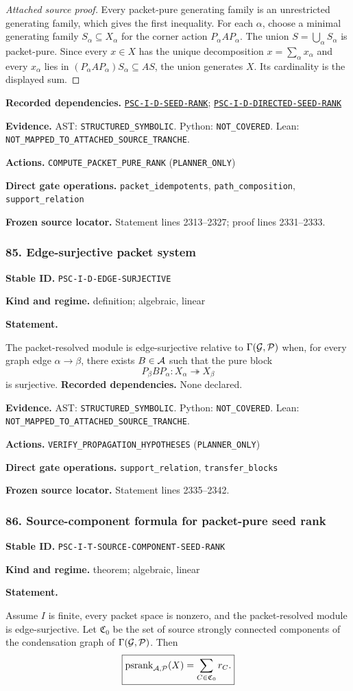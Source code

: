 \documentclass[a4paper,11pt]{article}
\newcommand{\field}[2]{\noindent\textbf{#1.} #2\par}
\begin{document}
\begin{proof}[Attached source proof]
Every packet-pure generating family is an unrestricted generating family, which gives the first inequality.  For each $\alpha$, choose a minimal generating family $S_\alpha\subseteq X_\alpha$ for the corner action $P_\alpha A P_\alpha$.  The union $S=\bigcup_\alpha S_\alpha$ is packet-pure.  Since every $x\in X$ has the unique decomposition $x=\sum_\alpha x_\alpha$ and every $x_\alpha$ lies in $(P_\alpha A P_\alpha)S_\alpha\subseteq AS$, the union generates $X$.  Its cardinality is the displayed sum.
\end{proof}
\field{Recorded dependencies}{\hyperref[rec:PSC-I-D-SEED-RANK]{\nolinkurl{PSC-I-D-SEED-RANK}}; \hyperref[rec:PSC-I-D-DIRECTED-SEED-RANK]{\nolinkurl{PSC-I-D-DIRECTED-SEED-RANK}}}
\field{Evidence}{AST: \nolinkurl{STRUCTURED_SYMBOLIC}. Python: \nolinkurl{NOT_COVERED}. Lean: \nolinkurl{NOT_MAPPED_TO_ATTACHED_SOURCE_TRANCHE}.}
\field{Actions}{\nolinkurl{COMPUTE_PACKET_PURE_RANK} (\nolinkurl{PLANNER_ONLY})}
\field{Direct gate operations}{\nolinkurl{packet_idempotents}, \nolinkurl{path_composition}, \nolinkurl{support_relation}}
\field{Frozen source locator}{Statement lines 2313--2327; proof lines 2331--2333.}
\subsubsection*{85. Edge-surjective packet system}
\label{rec:PSC-I-D-EDGE-SURJECTIVE}
\field{Stable ID}{\nolinkurl{PSC-I-D-EDGE-SURJECTIVE}}
\field{Kind and regime}{definition; algebraic, linear}
\textbf{Statement.}\par
The packet-resolved module is edge-surjective relative to $\Gamma(\mathcal G,\mathcal P)$ when, for every graph edge $\alpha\to\beta$, there exists $B\in\mathcal A$ such that the pure block
\[
P_\beta BP_\alpha:X_\alpha\twoheadrightarrow X_\beta
\]
is surjective.
\field{Recorded dependencies}{None declared.}
\field{Evidence}{AST: \nolinkurl{STRUCTURED_SYMBOLIC}. Python: \nolinkurl{NOT_COVERED}. Lean: \nolinkurl{NOT_MAPPED_TO_ATTACHED_SOURCE_TRANCHE}.}
\field{Actions}{\nolinkurl{VERIFY_PROPAGATION_HYPOTHESES} (\nolinkurl{PLANNER_ONLY})}
\field{Direct gate operations}{\nolinkurl{support_relation}, \nolinkurl{transfer_blocks}}
\field{Frozen source locator}{Statement lines 2335--2342.}
\subsubsection*{86. Source-component formula for packet-pure seed rank}
\label{rec:PSC-I-T-SOURCE-COMPONENT-SEED-RANK}
\field{Stable ID}{\nolinkurl{PSC-I-T-SOURCE-COMPONENT-SEED-RANK}}
\field{Kind and regime}{theorem; algebraic, linear}
\textbf{Statement.}\par
Assume $I$ is finite, every packet space is nonzero, and the packet-resolved module is edge-surjective.  Let $\mathfrak C_0$ be the set of source strongly connected components of the condensation graph of $\Gamma(\mathcal G,\mathcal P)$.  Then
\[
\boxed{
\operatorname{psrank}_{\mathcal A,\mathcal P}(X)
=
\sum_{C\in\mathfrak C_0}r_C.
}
\]
\end{document}
